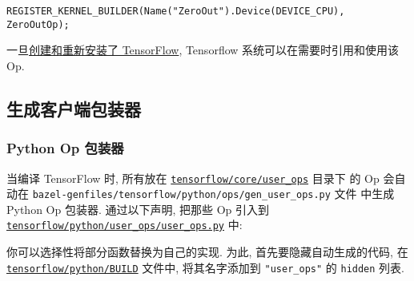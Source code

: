 \begin{verbatim}
REGISTER_KERNEL_BUILDER(Name("ZeroOut").Device(DEVICE_CPU), ZeroOutOp);
\end{verbatim}

一旦\href{tensorflow-zh/SOURCE/get_started/os_setup.md\#create-pip}{创建和重新安装了
TensorFlow}, Tensorflow 系统可以在需要时引用和使用该 Op.

\subsection{生成客户端包装器
}\label{ux751fux6210ux5ba2ux6237ux7aefux5305ux88c5ux5668}

\subsubsection{Python Op 包装器 }\label{python-op-ux5305ux88c5ux5668}

当编译 TensorFlow 时, 所有放在
\href{https://tensorflow.googlesource.com/tensorflow/+/master/tensorflow/core/user_ops/}{\texttt{tensorflow/core/user\_ops}}
目录下 的 Op 会自动在
\texttt{bazel-genfiles/tensorflow/python/ops/gen\_user\_ops.py} 文件
中生成 Python Op 包装器. 通过以下声明, 把那些 Op 引入到
\href{https://tensorflow.googlesource.com/tensorflow/+/master/tensorflow/python/user_ops/user_ops.py}{\texttt{tensorflow/python/user\_ops/user\_ops.py}}
中:

\begin{Shaded}
\begin{Highlighting}[]
  \OperatorTok{*}
\end{Highlighting}
\end{Shaded}

你可以选择性将部分函数替换为自己的实现. 为此, 首先要隐藏自动生成的代码,
在
\href{https://tensorflow.googlesource.com/tensorflow/+/master/tensorflow/python/BUILD}{\texttt{tensorflow/python/BUILD}}
文件中, 将其名字添加到 \texttt{"user\_ops"} 的 \texttt{hidden} 列表.

\begin{Shaded}
\begin{Highlighting}[]
    \OperatorTok{=} \NormalTok{,}
    \OperatorTok{=} \NormalTok{[}
        \NormalTok{,}
    \NormalTok{],}
    \OperatorTok{=} \NormalTok{,}
\NormalTok{)}
\end{Highlighting}
\end{Shaded}

